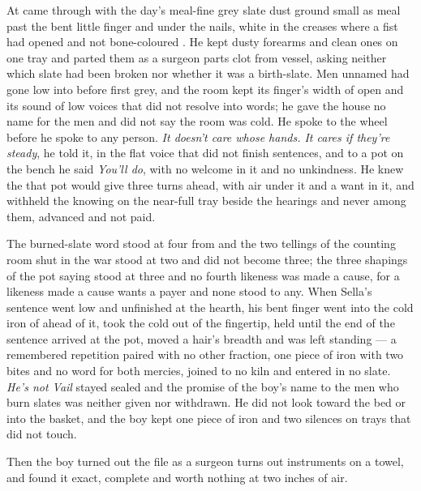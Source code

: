At   came through with the day's meal-fine grey slate dust ground small as meal past the bent little finger and under the nails, white in the creases where a fist had opened and not bone-coloured . He kept dusty forearms and clean ones on one tray and parted them as a surgeon parts clot from vessel, asking neither which slate had been broken nor whether it was a birth-slate. Men unnamed had gone low into  before first grey, and the room kept its finger's width of open and its sound of low voices that did not resolve into words; he gave the house no name for the men and did not say the room was cold. He spoke to the wheel before he spoke to any person. \emph{It doesn't care whose hands. It cares if they're steady}, he told it, in the flat voice that did not finish sentences, and to a pot on the bench he said \emph{You'll do}, with no welcome in it and no unkindness. He knew the  that pot would give three turns ahead, with air under it and a want in it, and withheld the knowing on the near-full tray beside the hearings and never among them, advanced and not paid.

The burned-slate word stood at four from  and the two tellings of the counting room shut in the war stood at two and did not become three; the three shapings of the pot saying stood at three and no fourth likeness was made a cause, for a likeness made a cause wants a payer and none stood to any. When Sella's sentence went low and unfinished at the hearth, his bent finger went into the cold iron of  ahead of it, took the cold out of the fingertip, held until the end of the sentence arrived at the pot, moved a hair's breadth and was left standing --- a remembered repetition paired with no other fraction, one piece of iron with two bites and no  word for both mercies, joined to no kiln and entered in no slate. \emph{He's not Vail} stayed sealed and the promise of the boy's name to the men who burn slates was neither given nor withdrawn. He did not look toward the bed or into the basket, and the boy kept one piece of iron and two silences on trays that did not touch.

\scenebreak

Then the boy turned out the file as a surgeon turns out instruments on a towel, and found it exact, complete and worth nothing at two inches of air.

